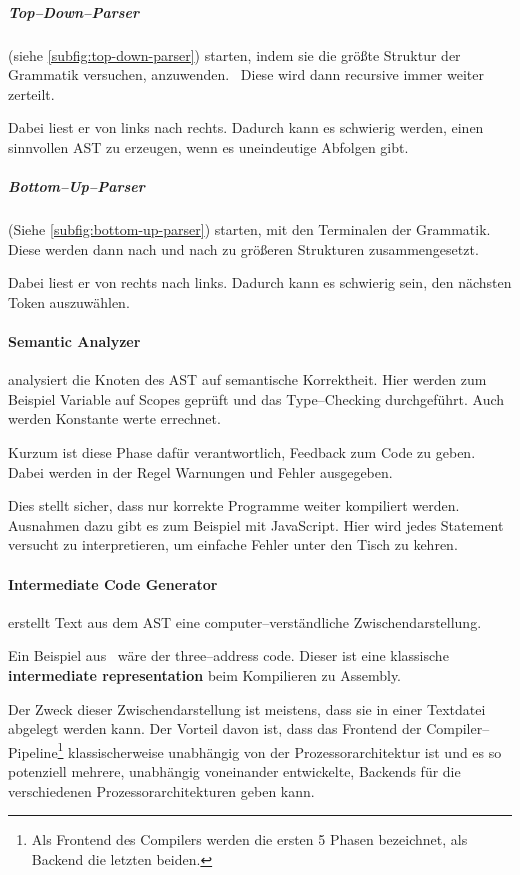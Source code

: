 \subparagraph{Top--Down--Parser} (siehe \autoref{subfig:top-down-parser}) starten, indem sie die größte Struktur der Grammatik versuchen, anzuwenden.~\autocite{geeksforgeeks-2021A}
Diese wird dann recursive immer weiter zerteilt.

Dabei liest er von links nach rechts.
Dadurch kann es schwierig werden, einen sinnvollen \ac{AST} zu erzeugen, wenn es uneindeutige Abfolgen gibt.

\subparagraph{Bottom--Up--Parser} (Siehe \autoref{subfig:bottom-up-parser}) starten, mit den Terminalen der Grammatik.~\autocite{geeksforgeeks-2021B}
Diese werden dann nach und nach zu größeren Strukturen zusammengesetzt.

Dabei liest er von rechts nach links.
Dadurch kann es schwierig sein, den nächsten Token auszuwählen.

\paragraph{Semantic Analyzer} analysiert die Knoten des \ac{AST} auf semantische Korrektheit.
Hier werden zum Beispiel Variable auf Scopes geprüft und das Type--Checking durchgeführt.
Auch werden Konstante werte errechnet.

Kurzum ist diese Phase dafür verantwortlich, Feedback zum Code zu geben.
Dabei werden in der Regel Warnungen und Fehler ausgegeben.

Dies stellt sicher, dass nur korrekte Programme weiter kompiliert werden.
Ausnahmen dazu gibt es zum Beispiel mit JavaScript.
Hier wird jedes Statement versucht zu interpretieren, um einfache Fehler unter den Tisch zu kehren.

\paragraph{Intermediate Code Generator} erstellt Text aus dem \ac{AST} eine computer--verständliche Zwischendarstellung.

Ein Beispiel aus~\cite{aho-2006} wäre der three--address code.
Dieser ist eine klassische \textbf{intermediate representation} beim Kompilieren zu Assembly.

Der Zweck dieser Zwischendarstellung ist meistens, dass sie in einer Textdatei abgelegt werden kann.
Der Vorteil davon ist, dass das Frontend der Compiler--Pipeline\footnote{Als Frontend des Compilers werden die ersten 5 Phasen bezeichnet, als Backend die letzten beiden.} klassischerweise unabhängig von der Prozessorarchitektur ist und es so potenziell mehrere, unabhängig voneinander entwickelte, Backends für die verschiedenen Prozessorarchitekturen geben kann.

